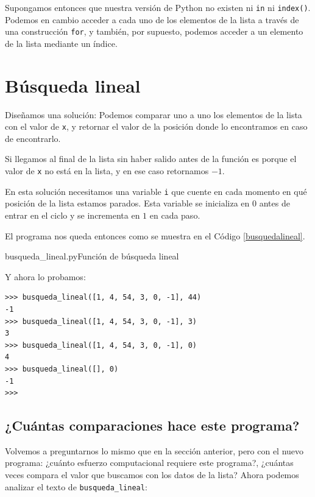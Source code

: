 Supongamos entonces que nuestra versión de Python no existen ni \lstinline+in+
ni \lstinline+index()+. Podemos en cambio acceder a cada uno de los elementos
de la lista a través de una construcción \lstinline+for+, y también, por
supuesto, podemos acceder a un elemento de la lista mediante un índice.

\section{Búsqueda lineal}

Diseñamos una solución: Podemos comparar uno a uno los elementos de la
lista con el valor de \lstinline!x!, y retornar el valor de la posición
donde lo encontramos en caso de encontrarlo.

Si llegamos al final de la lista sin haber salido antes de la función es
porque el valor de \lstinline!x! no está en la lista, y en ese caso
retornamos $-1$.

En esta solución necesitamos una variable \lstinline!i! que cuente en cada
momento en qué posición de la lista estamos parados. Esta variable se
inicializa en $0$ antes de entrar en el ciclo y se incrementa en $1$ en
cada paso.

El programa nos queda entonces como se muestra en el Código
\ref{busquedalineal}. \\

\begin{codigo}{busqueda\_lineal.py}{Función de búsqueda lineal}
\label{busquedalineal}

\end{codigo}

Y ahora lo probamos:
\begin{verbatim}
>>> busqueda_lineal([1, 4, 54, 3, 0, -1], 44)
-1
>>> busqueda_lineal([1, 4, 54, 3, 0, -1], 3)
3
>>> busqueda_lineal([1, 4, 54, 3, 0, -1], 0)
4
>>> busqueda_lineal([], 0)
-1
>>>
\end{verbatim}

\subsection*{¿Cuántas comparaciones hace este programa?}

Volvemos a preguntarnos lo mismo que en la sección anterior, pero con el nuevo
programa: ¿cuánto esfuerzo computacional requiere este programa?, ¿cuántas
veces compara el valor que buscamos con los datos de la lista? Ahora podemos
analizar el texto de \lstinline!busqueda_lineal!:

